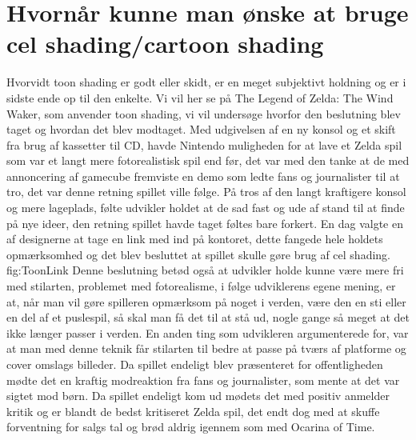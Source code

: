 \newpage
\section{Hvornår kunne man ønske at bruge cel shading/cartoon shading}

Hvorvidt toon shading er godt eller skidt, er en meget subjektivt holdning og er i sidste ende op til den enkelte. Vi vil her se på The Legend of Zelda: The Wind Waker, som anvender toon shading, vi vil undersøge hvorfor den beslutning blev taget og hvordan det blev modtaget. Med udgivelsen af en ny konsol og et skift fra brug af kassetter til CD, havde Nintendo muligheden for at lave et Zelda spil som var et langt mere fotorealistisk spil end før, det var med den tanke at de med annoncering af gamecube fremviste en demo \cite{Zelda} som ledte fans og journalister til at tro, det var denne retning spillet ville følge. På tros af den langt kraftigere konsol og mere lageplads, følte udvikler holdet at de sad fast og ude af stand til at finde på nye \cite{Zelda} ideer, den retning spillet havde taget føltes bare forkert. En dag valgte en af designerne at tage en \cite{ToonLinkIsBorn} link med ind på kontoret, dette fangede hele holdets opmærksomhed og det blev besluttet at spillet skulle gøre brug af cel shading.
 {} {fig:ToonLink}
Denne beslutning betød også at udvikler holde kunne være mere fri med stilarten, problemet med fotorealisme, i følge udviklerens egene mening, er at, når man vil gøre spilleren opmærksom på noget i verden, være den en sti eller en del af et puslespil, så skal man få det til at stå ud, nogle gange så meget at det ikke længer passer i verden. En anden ting som udvikleren argumenterede for, var at man med denne teknik får stilarten til bedre at passe på tværs af platforme og cover omslags \cite{nintendo}billeder. Da spillet endeligt blev præsenteret for offentligheden mødte det en kraftig modreaktion fra fans og journalister, som mente at det var sigtet mod 
\cite{nintendo} børn. Da spillet endeligt kom ud mødets det med positiv \cite{BigScore} anmelder kritik og er blandt de bedst kritiseret Zelda spil, det endt dog med at skuffe forventning for salgs tal og brød aldrig igennem som med Ocarina of Time.